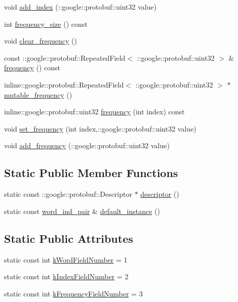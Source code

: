 \begin{DoxyCompactItemize}
\item 
void \hyperlink{class_l_d_a_1_1word__ind__pair_a4b2ce0d0631bf196e552db1e803b6173}{add\_\-index} (::google::protobuf::uint32 value)
\item 
int \hyperlink{class_l_d_a_1_1word__ind__pair_a5a8f75c1af5c6a74b8ff473c4e64902d}{frequency\_\-size} () const 
\item 
void \hyperlink{class_l_d_a_1_1word__ind__pair_a202c7f59793ddac039aa4361eba8e21e}{clear\_\-frequency} ()
\item 
const ::google::protobuf::RepeatedField$<$ ::google::protobuf::uint32 $>$ \& \hyperlink{class_l_d_a_1_1word__ind__pair_a3559975ed278b3c1c1e85c4c87ed9881}{frequency} () const 
\item 
inline::google::protobuf::RepeatedField$<$ ::google::protobuf::uint32 $>$ $\ast$ \hyperlink{class_l_d_a_1_1word__ind__pair_acb159c0917346581889e7a6dbb66a197}{mutable\_\-frequency} ()
\item 
inline::google::protobuf::uint32 \hyperlink{class_l_d_a_1_1word__ind__pair_a6c44dbd24bf839caf7d8bdcc6a665437}{frequency} (int index) const 
\item 
void \hyperlink{class_l_d_a_1_1word__ind__pair_adfbb9f67c44e1edff7397dc83e7363fc}{set\_\-frequency} (int index,::google::protobuf::uint32 value)
\item 
void \hyperlink{class_l_d_a_1_1word__ind__pair_a0156a95fe97af94ebe3454090f3161dd}{add\_\-frequency} (::google::protobuf::uint32 value)
\end{DoxyCompactItemize}
\subsection*{Static Public Member Functions}
\begin{DoxyCompactItemize}
\item 
static const ::google::protobuf::Descriptor $\ast$ \hyperlink{class_l_d_a_1_1word__ind__pair_a78a2ee5b1469b4ffd50c6df6f7994dea}{descriptor} ()
\item 
static const \hyperlink{class_l_d_a_1_1word__ind__pair}{word\_\-ind\_\-pair} \& \hyperlink{class_l_d_a_1_1word__ind__pair_aa3672a98d52d81e3de61486dfd22aadb}{default\_\-instance} ()
\end{DoxyCompactItemize}
\subsection*{Static Public Attributes}
\begin{DoxyCompactItemize}
\item 
static const int \hyperlink{class_l_d_a_1_1word__ind__pair_a9fc278e2b803654eb8daf2b6bd7e4e12}{kWordFieldNumber} = 1
\item 
static const int \hyperlink{class_l_d_a_1_1word__ind__pair_a73654f22613eeb3b1d759830a2f884e2}{kIndexFieldNumber} = 2
\item 
static const int \hyperlink{class_l_d_a_1_1word__ind__pair_abe2c7f5b4c07012fef28c04c3daf7420}{kFrequencyFieldNumber} = 3
\end{DoxyCompactItemize}
